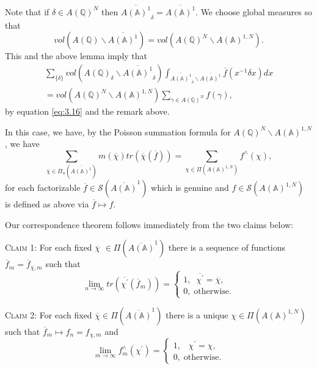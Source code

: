 Note that if $\delta\in A({\mathbb{Q}})^N$ then
$\overline{A({\mathbb{A}})^1}_\delta=\overline{A({\mathbb{A}})^1}$.
We choose global measures so that
\[
vol(A({\mathbb{Q}}) \backslash \overline{A({\mathbb{A}})^1})
=vol(A({\mathbb{Q}})^N \backslash A({\mathbb{A}})^{1,N}).
\]
This and the above lemma imply that 
\begin{equation}\label{eq:3.18}
\begin{array}{c}
\sum_{\{\delta \}}
vol(A({\mathbb{Q}})_\delta \backslash \overline{A({\mathbb{A}})^1}_{\delta })
\int_{\overline{A({\mathbb{A}})^1}_{\delta }\backslash 
\overline{A({\mathbb{A}})^1}}
\overline{f}(x^{-1}\delta x)dx \\ 
=vol(A({\mathbb{Q}})^N \backslash A({\mathbb{A}})^{1,N})
\sum_{\gamma \in A({\mathbb{Q}})^N}
f(\gamma ),
\end{array}
\end{equation}
by equation \eqref{eq:3.16} and the remark above.

In this case, we have, by the Poisson summation formula for
$A({\mathbb{Q}})^N\backslash A({\mathbb{A}})^{1,N}$, we have 
\begin{equation}\label{eq:3.19}
\sum_{\overline{\chi }\in
\Pi_u (\overline{A({\mathbb{A}})^1})}m(\overline{\chi })
tr(\overline{\chi }(\overline{f}))
=\sum_{\chi \in \Pi (A({\mathbb{A}})^{1,N})}
f^{\wedge }(\chi ),
\end{equation}
for each factorizable
$\overline{f}\in {\mathcal{S}}(\overline{A({\mathbb{A}})}^1)$
which is genuine and $f\in {\mathcal{S}}(A({\mathbb{A}})^{1,N})$
is defined as above
via $\overline{f}\longmapsto f$.

Our correspondence theorem follows immediately from the two claims below:

\textsc{Claim 1}: For each fixed $\overline{\chi }$
$\in \Pi (\overline{A({\mathbb{A}})}^1)$ there is a sequence of
functions
$\overline{f}_m
=\overline{f}_{\overline{\chi },m}$ such that 
\[
\lim_{n\rightarrow \infty }
tr(\overline{\chi ^{\prime }}(\overline{f}_m))
=\left\{ 
\begin{array}{c}
1,\;\;\overline{\chi ^{\prime }}=\overline{\chi }, \\ 
0,\;\mathrm{otherwise}.
\end{array}
\right. 
\]

\textsc{Claim 2}: For each fixed
$\overline{\chi }\in \Pi (\overline{A({\mathbb{A}})}^1)$
there is a unique $\chi \in \Pi (A({\mathbb{A}})^{1,N})$ such that
$\overline{f}_m\longmapsto f_n=f_{\chi ,m}$ and 
\[
\lim_{m\rightarrow \infty }f_m^{\wedge }(\chi ^{\prime })=\left\{ 
\begin{array}{c}
1,\;\;\;\chi ^{\prime }=\chi , \\ 
0,\;\mathrm{otherwise}.
\end{array}
\right. 
\]

